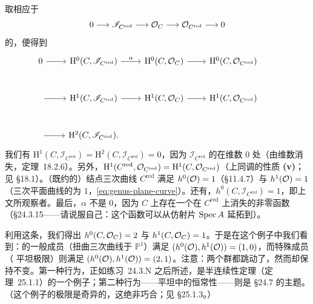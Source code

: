 取相应于
\[
0\longrightarrow\mathscr{I}_{C^{\mathrm{red}}}\longrightarrow\mathcal{O}_C\longrightarrow\mathcal{O}_{C^{\mathrm{red}}}\longrightarrow 0
\]
的\trLongExactSequence，便得到
\begin{equation*}
\begin{tikzcd}[row sep=2.6em, column sep=2.2em]
0 \ar[r] & \mathrm{H}^0(C,\mathscr{I}_{C^{\mathrm{red}}}) \ar[r,"\alpha"] & \mathrm{H}^0(C,\OO_C) \ar[r] & \mathrm{H}^0(C,\OO_{C^{\mathrm{red}}}) & \\
 \ar[r] & \mathrm{H}^1(C,\mathscr{I}_{C^{\mathrm{red}}}) \ar[r] & \mathrm{H}^1(C,\OO_C) \ar[r] & \mathrm{H}^1(C,\OO_{C^{\mathrm{red}}}) & \\
 \ar[r] & \mathrm{H}^2(C,\mathscr{I}_{C^{\mathrm{red}}}). & & &
\end{tikzcd}
\end{equation*}
我们有 $\mathrm{H}^1(C,\mathscr{I}_{C^{\mathrm{red}}})=\mathrm{H}^2(C,\mathscr{I}_{C^{\mathrm{red}}})=0$，因为 $\mathscr{I}_{C^{\mathrm{red}}}$ 的\trSupport{}在维数 $0$ 处（由维数\trCohomology{}消失，\mbox{定理~18.2.6}）。另外，$\mathrm{H}^1(C^{\mathrm{red}},\mathcal{O}_{C^{\mathrm{red}}})=\mathrm{H}^1(C,\mathcal{O}_{C^{\mathrm{red}}})$（上同调的性质 \textbf{(v)}；见 \S18.1）。（既约的）结点三次曲线 $C^{\mathrm{red}}$ 满足 $h^0(\mathcal{O})=1$（\S11.4.7）与 $h^1(\mathcal{O})=1$（三次平面曲线的\trGenus{}为 $1$，\eqref{eq:genus-plane-curve}）。还有，$h^0(C,\mathscr{I}_{C^{\mathrm{red}}})=1$，即上文所观察者。最后，$\alpha$ 不是 $0$，因为 $C$ 上存在一个在 $C^{\mathrm{red}}$ 上消失的非零函数（\S24.3.15——请说服自己：这个函数可以从仿射片 $\operatorname{Spec} A$ 延拓到\trProjectiveCompletion）。

利用这条\trLongExactSequence，我们得出 $h^0(C,\mathcal{O}_C)=2$ 与 $h^1(C,\mathcal{O}_C)=1$。于是在这个例子中我们看到：\trFamily{}的一般成员（扭曲三次曲线\trIsomorphic{}于 $\mathbb{P}^1$）满足 $(h^0(\mathcal{O}),h^1(\mathcal{O}))=(1,0)$，而特殊成员（
平坦极限）则满足 $(h^0(\mathcal{O}),h^1(\mathcal{O}))=(2,1)$。注意：两个\trCohomology{}群都跳动了，然而\trEulerCharacteristic{}却保持不变。第一种行为，正如\mbox{练习~24.3.N} 之后所述，是半连续性定理（\mbox{定理~25.1.1}）的一个例子；第二种行为——平坦\trFamily{}中\trEulerCharacteristic{}的恒常性——则是 \S24.7 的主题。（这个例子的极限是奇异的，这绝非巧合；见 \S25.1.3。）
